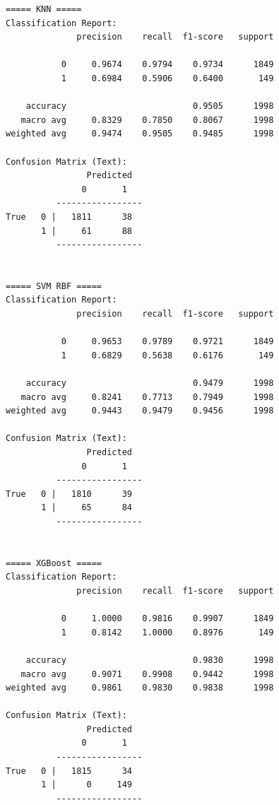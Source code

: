 \begin{lstlisting}[caption={Output 9}]
===== KNN =====
Classification Report:
              precision    recall  f1-score   support

           0     0.9674    0.9794    0.9734      1849
           1     0.6984    0.5906    0.6400       149

    accuracy                         0.9505      1998
   macro avg     0.8329    0.7850    0.8067      1998
weighted avg     0.9474    0.9505    0.9485      1998

Confusion Matrix (Text):
                Predicted
               0       1
          -----------------
True   0 |   1811      38
       1 |     61      88
          -----------------


===== SVM RBF =====
Classification Report:
              precision    recall  f1-score   support

           0     0.9653    0.9789    0.9721      1849
           1     0.6829    0.5638    0.6176       149

    accuracy                         0.9479      1998
   macro avg     0.8241    0.7713    0.7949      1998
weighted avg     0.9443    0.9479    0.9456      1998

Confusion Matrix (Text):
                Predicted
               0       1
          -----------------
True   0 |   1810      39
       1 |     65      84
          -----------------


===== XGBoost =====
Classification Report:
              precision    recall  f1-score   support

           0     1.0000    0.9816    0.9907      1849
           1     0.8142    1.0000    0.8976       149

    accuracy                         0.9830      1998
   macro avg     0.9071    0.9908    0.9442      1998
weighted avg     0.9861    0.9830    0.9838      1998

Confusion Matrix (Text):
                Predicted
               0       1
          -----------------
True   0 |   1815      34
       1 |      0     149
          -----------------
\end{lstlisting}

